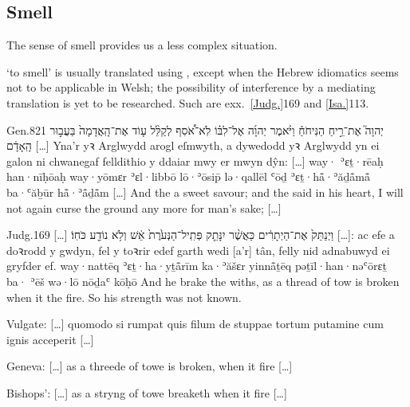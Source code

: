\subsection{Smell}

{\click} The sense of smell provides us a less complex situation.




\begin{paper}
	 ‘to smell’ is usually translated using , except when the Hebrew idiomatics seems not to be applicable in Welsh; the possibility of interference by a mediating translation is yet to be researched. Such are exx.~\vref{Judg.}{16}{9}{} and \vref{Isa.}{11}{3}{}.
\end{paper}

\begin{example}{Gen.}{8}{21}{}{}
	\quoling
	{ יְהוָה֮ אֶת־רֵ֣יחַ הַנִּיחֹחַ֒ וַיֹּ֨אמֶר יְהוָ֜ה אֶל־לִבּ֗וֹ לֹֽא־אֹ֠סִף לְקַלֵּ֨ל ע֤וֹד אֶת־הָֽאֲדָמָה֙ בַּעֲב֣וּר הָֽאָדָ֔ם […]}
	{Yna’r  yꝛ Arglwydd arogl eſmwyth, a dywedodd yꝛ Arglwydd yn ei galon ni chwanegaf felldithio y ddaiar mwy er mwyn dŷn: […]}
	{way· {\YHWH} ʾɛṯ·rēaḥ han·nīḥōaḥ way·yōmɛr {\YHWH} ʾɛl·libbō lō·ʾōsip̄ lə·qallēl ʿōḏ ʾɛṯ·hå̄·ʾăḏå̄må̄ ba·ʿăḇūr hå̄·ʾå̄ḏå̄m […]}
	{And the {\LORD}  a sweet savour; and the {\LORD} said in his heart, I will not again curse the ground any more for man’s sake; […]}
\end{example}

\begin{example}{Judg.}{16}{9}{}{}
	\quoling
	{[…] וַיְנַתֵּק֙ אֶת־הַיְתָרִ֔ים כַּאֲשֶׁ֨ר יִנָּתֵ֤ק פְּתִֽיל־הַנְּעֹ֙רֶת֙  אֵ֔שׁ וְלֹ֥א נוֹדַ֖ע כֹּחֽוֹ׃}
	{[…]: ac efe a doꝛrodd y gwdyn, fel y toꝛrir edef garth wedi  [a’r] tân, felly nid adnabuwyd ei gryfder ef.}
	{way·nattēq ʾɛṯ·ha·yṯå̄rīm ka·ʾăšɛr yinnå̄ṯēq pəṯīl·han·nəʿōrɛṯ ba· ʾēš wə·lō nōḏaʿ kōḥō}
	{And he brake the withs, as a thread of tow is broken when it  the fire. So his strength was not known.}
\end{example}
\begin{compactdesc}\small
	\item [Vulgate:] […] quomodo si rumpat quis filum de stuppae tortum putamine cum  ignis acceperit […]
	\item [Geneva:] […] as a threede of towe is broken, when it  fire […]
	\item [Bishops’:] […] as a stryng of towe breaketh when it  fire […]
\end{compactdesc}

